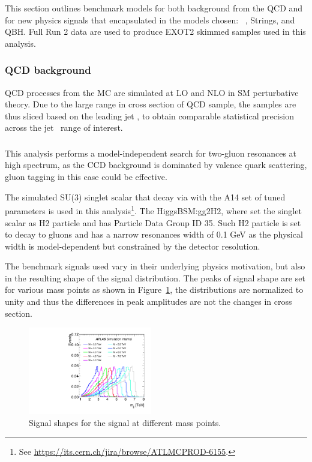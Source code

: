 This section outlines benchmark models for both background from the QCD and for new
physics signals that encapsulated in the models chosen:
\Hprime\ , Strings, and QBH.
Full Run 2 data are used to produce EXOT2 skimmed samples used in this analysis.

\subsubsection{QCD background}
\label{qcdsamps}

QCD processes from the MC are simulated at LO and NLO in SM perturbative theory. Due to the large range in cross section of QCD sample, the samples are thus sliced based on the leading jet \pt,  to obtain comparable statistical precision across the jet \pt~range of interest.



\subsubsection{\Hprime}
\label{sec:hprime}

This analysis performs a model-independent search for two-gluon resonances at high \mjj spectrum, as the CCD background is dominated by valence quark scattering, gluon tagging in this case could be effective. 

The simulated SU(3) singlet scalar that decay via  with the A14 set of tuned 
parameters is used in this analysis\footnote{See \url{https://its.cern.ch/jira/browse/ATLMCPROD-6155}.}. The HiggsBSM:gg2H2, where set the singlet scalar as H2 particle and has Particle Data Group ID 35. Such H2 particle is set to decay to gluons and has a narrow resonances width of 0.1 GeV as the physical width is 
model-dependent but constrained by the detector resolution.

The benchmark signals used vary in their underlying physics motivation, but also in the resulting shape of the signal \mjj distribution. The peaks of signal shape are set for various mass points as shown in Figure~\ref{fig:shape_Hprime}, the distributions are normalized to unity and thus the differences in peak amplitudes are not the changes in cross section.

\begin{figure}[htb]
\centering
\includegraphics[width=0.48\textwidth]{fig/benchmark_signals/SignalShape-Hprime.pdf}
\caption{Signal shapes for the \Hprime signal at different mass points.}
\label{fig:shape_Hprime}
\end{figure}
\FloatBarrier

